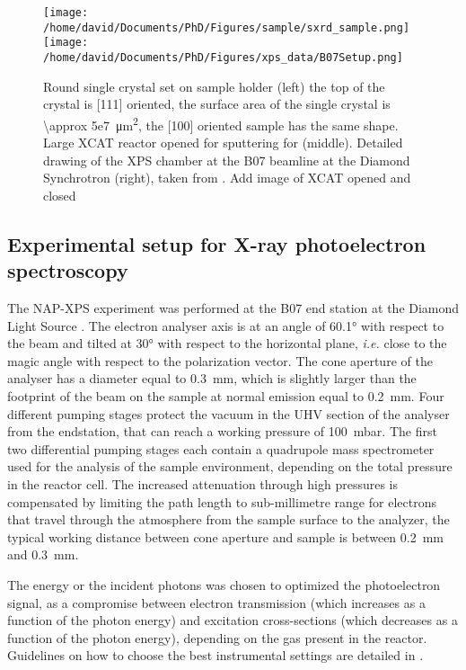 
\begin{figure}[!htb]
    \centering
    \texttt{[image: /home/david/Documents/PhD/Figures/sample/sxrd\_sample.png]}
    \texttt{[image: /home/david/Documents/PhD/Figures/xps\_data/B07Setup.png]}
    \caption{
        Round single crystal set on sample holder (left) the top of the crystal is [111] oriented, the surface area of the single crystal is \qty{\approx 5e7}{\um^2}, the [100] oriented sample has the same shape.
        Large XCAT reactor opened for sputtering for (middle).
        Detailed drawing of the XPS chamber at the B07 beamline at the Diamond Synchrotron (right), taken from \parencite{Held2020}.
        \textcolor{Important}{Add image of XCAT opened and closed}
    }
    \label{fig:SampleSXRD}
\end{figure}

\subsection{Experimental setup for X-ray photoelectron spectroscopy} \label{sec:XPS111}

The NAP-XPS experiment was performed at the B07 end station at the Diamond Light Source \parencite{Held2020}.
The electron analyser axis is at an angle of \ang{60.1} with respect to the beam and tilted at \ang{30} with respect to the horizontal plane, \textit{i.e.} close to the magic angle with respect to the polarization vector.
The cone aperture of the analyser has a diameter equal to \qty{0.3}{\mm}, which is slightly larger than the footprint of the beam on the sample at normal emission equal to \qty{0.2}{\mm}.
Four different pumping stages protect the vacuum in the UHV section of the analyser from the endstation, that can reach a working pressure of \qty{100}{\milli\bar}.
The ﬁrst two differential pumping stages each contain a quadrupole mass spectrometer used for the analysis of the sample environment, depending on the total pressure in the reactor cell.
The increased attenuation through high pressures is compensated by limiting the path length to sub-millimetre range for electrons that travel through the atmosphere from the sample surface to the analyzer, the typical working distance between cone aperture and sample is between \qty{0.2}{\mm} and \qty{0.3}{\mm}.

The energy or the incident photons was chosen to optimized the photoelectron signal, as a compromise between electron transmission (which increases as a function of the photon energy) and excitation cross-sections (which decreases as a function of the photon energy), depending on the gas present in the reactor.
Guidelines on how to choose the best instrumental settings are detailed in \parencite{Held2020}.
